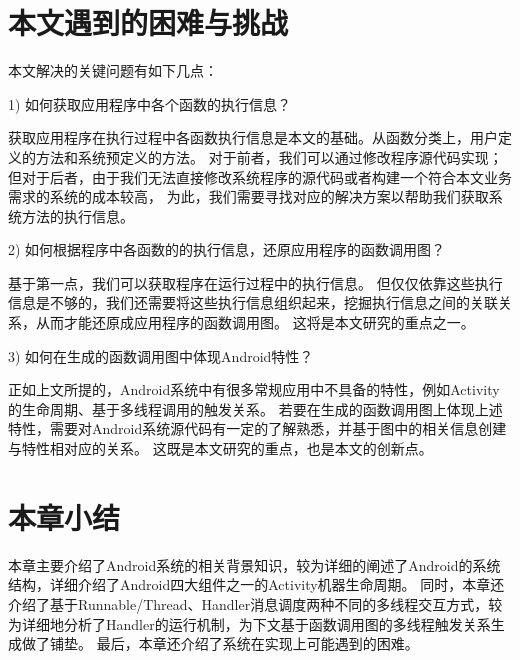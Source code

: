 \section{本文遇到的困难与挑战}


本文解决的关键问题有如下几点：

1)	如何获取应用程序中各个函数的执行信息？

获取应用程序在执行过程中各函数执行信息是本文的基础。从函数分类上，用户定义的方法和系统预定义的方法。
对于前者，我们可以通过修改程序源代码实现；但对于后者，由于我们无法直接修改系统程序的源代码或者构建一个符合本文业务需求的系统的成本较高，
为此，我们需要寻找对应的解决方案以帮助我们获取系统方法的执行信息。

2)	如何根据程序中各函数的的执行信息，还原应用程序的函数调用图？

基于第一点，我们可以获取程序在运行过程中的执行信息。
但仅仅依靠这些执行信息是不够的，我们还需要将这些执行信息组织起来，挖掘执行信息之间的关联关系，从而才能还原成应用程序的函数调用图。
这将是本文研究的重点之一。

3)	如何在生成的函数调用图中体现Android特性？

正如上文所提的，Android系统中有很多常规应用中不具备的特性，例如Activity的生命周期、基于多线程调用的触发关系。
若要在生成的函数调用图上体现上述特性，需要对Android系统源代码有一定的了解熟悉，并基于图中的相关信息创建与特性相对应的关系。
这既是本文研究的重点，也是本文的创新点。

\section{本章小结}

本章主要介绍了Android系统的相关背景知识，较为详细的阐述了Android的系统结构，详细介绍了Android四大组件之一的Activity机器生命周期。
同时，本章还介绍了基于Runnable/Thread、Handler消息调度两种不同的多线程交互方式，较为详细地分析了Handler的运行机制，为下文基于函数调用图的多线程触发关系生成做了铺垫。
最后，本章还介绍了系统在实现上可能遇到的困难。
